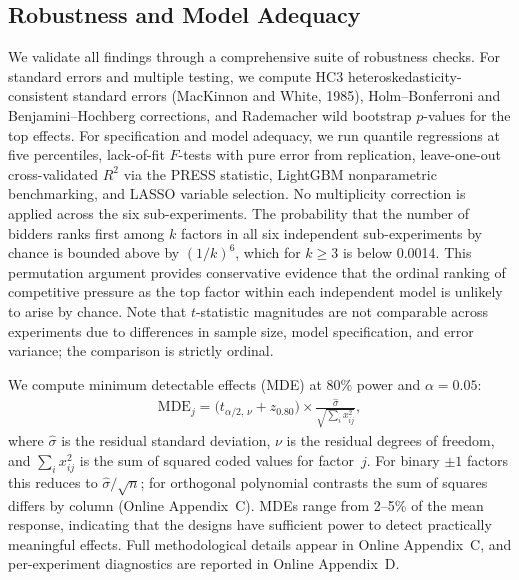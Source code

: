 \subsection{Robustness and Model Adequacy}

We validate all findings through a comprehensive suite of robustness checks. For standard errors and multiple testing, we compute HC3 heteroskedasticity-consistent standard errors (MacKinnon and White, 1985), Holm--Bonferroni and Benjamini--Hochberg corrections, and Rademacher wild bootstrap $p$-values for the top effects. For specification and model adequacy, we run quantile regressions at five percentiles, lack-of-fit $F$-tests with pure error from replication, leave-one-out cross-validated $R^2$ via the PRESS statistic, LightGBM nonparametric benchmarking, and LASSO variable selection. No multiplicity correction is applied across the six sub-experiments. The probability that the number of bidders ranks first among $k$ factors in all six independent sub-experiments by chance is bounded above by $(1/k)^6$, which for $k \geq 3$ is below 0.0014. This permutation argument provides conservative evidence that the ordinal ranking of competitive pressure as the top factor within each independent model is unlikely to arise by chance. Note that $t$-statistic magnitudes are not comparable across experiments due to differences in sample size, model specification, and error variance; the comparison is strictly ordinal.

We compute minimum detectable effects (MDE) at 80\% power and $\alpha = 0.05$:
\begin{align}
  \text{MDE}_{j} = \bigl(t_{\alpha/2,\,\nu} + z_{0.80}\bigr) \times \frac{\hat{\sigma}}{\sqrt{\sum_{i} x_{ij}^{2}}},
  \label{eq:mde}
\end{align}
where $\hat{\sigma}$ is the residual standard deviation, $\nu$ is the residual degrees of freedom, and $\sum_{i} x_{ij}^{2}$ is the sum of squared coded values for factor~$j$. For binary $\pm 1$ factors this reduces to $\hat{\sigma}/\sqrt{n}$; for orthogonal polynomial contrasts the sum of squares differs by column (Online Appendix~C). MDEs range from 2--5\% of the mean response, indicating that the designs have sufficient power to detect practically meaningful effects. Full methodological details appear in Online Appendix~C, and per-experiment diagnostics are reported in Online Appendix~D.

